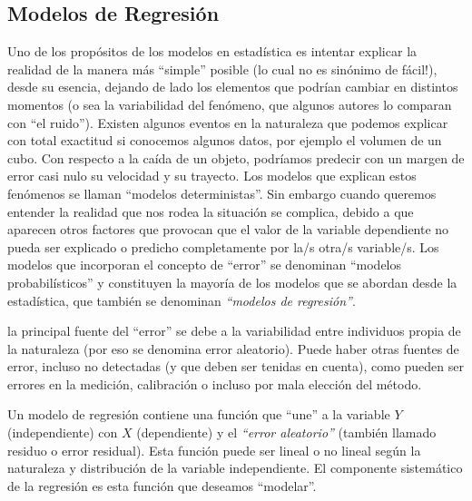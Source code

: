 \documentclass[
  letterpaper,
  DIV=11,
  numbers=noendperiod]{scrartcl}
\begin{document}
\subsection{Modelos de Regresión}\label{modelos-de-regresiuxf3n}

Uno de los propósitos de los modelos en estadística es intentar explicar
la realidad de la manera más ``simple'' posible (lo cual no es sinónimo
de fácil!), desde su esencia, dejando de lado los elementos que podrían
cambiar en distintos momentos (o sea la variabilidad del fenómeno, que
algunos autores lo comparan con ``el ruido''). Existen algunos eventos
en la naturaleza que podemos explicar con total exactitud si conocemos
algunos datos, por ejemplo el volumen de un cubo. Con respecto a la
caída de un objeto, podríamos predecir con un margen de error casi nulo
su velocidad y su trayecto. Los modelos que explican estos fenómenos se
llaman ``modelos deterministas''. Sin embargo cuando queremos entender
la realidad que nos rodea la situación se complica, debido a que
aparecen otros factores que provocan que el valor de la variable
dependiente no pueda ser explicado o predicho completamente por la/s
otra/s variable/s. Los modelos que incorporan el concepto de ``error''
se denominan ``modelos probabilísticos'' y constituyen la mayoría de los
modelos que se abordan desde la estadística, que también se denominan
\emph{``modelos de regresión''}.

\begin{tcolorbox}[enhanced jigsaw, toptitle=1mm, colbacktitle=quarto-callout-tip-color!10!white, opacitybacktitle=0.6, leftrule=.75mm, rightrule=.15mm, title=\textcolor{quarto-callout-tip-color}{\faLightbulb}\hspace{0.5em}{Nota}, colframe=quarto-callout-tip-color-frame, breakable, coltitle=black, bottomrule=.15mm, opacityback=0, left=2mm, titlerule=0mm, bottomtitle=1mm, toprule=.15mm, colback=white, arc=.35mm]

la principal fuente del ``error'' se debe a la variabilidad entre
individuos propia de la naturaleza (por eso se denomina error
aleatorio). Puede haber otras fuentes de error, incluso no detectadas (y
que deben ser tenidas en cuenta), como pueden ser errores en la
medición, calibración o incluso por mala elección del método.

\end{tcolorbox}

Un modelo de regresión contiene una función que ``une'' a la variable
\(Y\) (independiente) con \(X\) (dependiente) y el \emph{``error
aleatorio''} (también llamado residuo o error residual). Esta función
puede ser lineal o no lineal según la naturaleza y distribución de la
variable independiente. El componente sistemático de la regresión es
esta función que deseamos ``modelar''.
\end{document}
